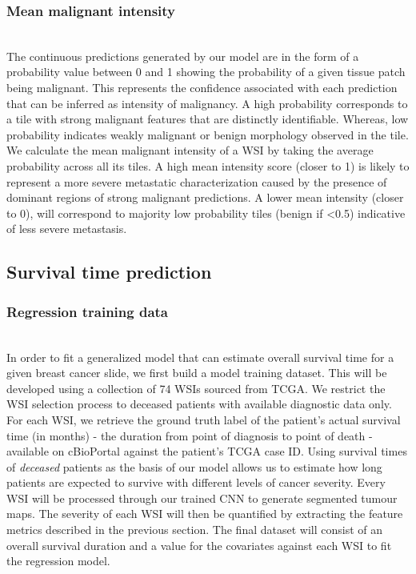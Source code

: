 \documentclass{l4proj}
\begin{document}
\subsubsection{Mean malignant intensity}
\hfill\\
The continuous predictions generated by our model are in the form of a probability value between 0 and 1 showing the probability of a given tissue patch being malignant. This represents the confidence  associated with each prediction that can be inferred as intensity of malignancy. A high probability corresponds to a tile with strong malignant features that are distinctly identifiable. Whereas, low probability indicates weakly malignant or benign morphology observed in the tile. We calculate the mean malignant intensity of a WSI by taking the average probability across all its tiles. A high mean intensity score (closer to 1) is likely to represent a more severe metastatic characterization caused by the presence of dominant regions of strong malignant predictions. A lower mean intensity (closer to 0), will correspond to majority low probability tiles (benign if <0.5) indicative of less severe metastasis. 

\subsection{Survival time prediction}
\subsubsection{Regression training data}
\hfill\\
In order to fit a generalized model that can estimate overall survival time for a given breast cancer slide, we first build a model training dataset. This will be developed using a collection of 74 WSIs sourced from TCGA. We restrict the WSI selection process to deceased patients with available diagnostic data only. For each WSI, we retrieve the ground truth label of the patient's actual survival time (in months) - the duration from point of diagnosis to point of death - available on cBioPortal against the patient's TCGA case ID. Using survival times of \textit{deceased} patients as the basis of our model allows us to estimate how long patients are expected to survive with different levels of cancer severity. Every WSI will be processed through our trained CNN to generate segmented tumour maps. The severity of each WSI will then be quantified by extracting the feature metrics described in the previous section. The final dataset will consist of an overall survival duration and a value for the covariates against each WSI to fit the regression model. \\
\end{document}
